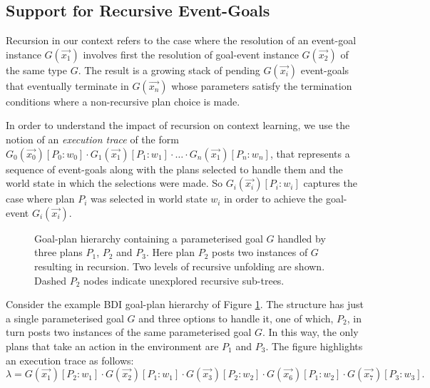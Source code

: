 \subsection{Support for Recursive Event-Goals}

Recursion in our context refers to the case where the resolution of an event-goal instance $G(\vec{x_1})$ involves first the resolution of goal-event instance $G(\vec{x_2})$ of the same type $G$. The result is a growing stack of pending $G(\vec{x_i})$ event-goals that eventually terminate in $G(\vec{x_n})$ whose parameters satisfy the termination conditions where a non-recursive plan choice is made.

In order to understand the impact of recursion on context learning, we use the notion of an \textit{execution trace} of the form $G_0(\vec{x_0})[P_0:w_0] \cdot G_1(\vec{x_1})[P_1:w_1] \cdot \ldots \cdot G_n(\vec{x_1})[P_n:w_n]$, that represents a sequence of event-goals along with the plans selected to handle them and the world state in which the selections were made. So $G_i(\vec{x_i})[P_i:w_i]$ captures the case where plan $P_i$ was selected in world state $w_i$ in order to achieve the goal-event $G_i(\vec{x_i})$.

\begin{figure}[t]
\begin{center}
\resizebox{0.8\textwidth}{!}{

}
\end{center}
\caption{Goal-plan hierarchy containing a parameterised goal $G$ handled by three plans $P_1$, $P_2$ and $P_3$. Here plan $P_2$ posts two instances of $G$ resulting in recursion. Two levels of recursive unfolding are shown. Dashed $P_2$ nodes indicate unexplored recursive sub-trees.}
\label{fig:unfolding}
\end{figure}

Consider the example BDI goal-plan hierarchy of Figure \ref{fig:unfolding}. The structure has just a single parameterised goal $G$ and three options to handle it, one of which, $P_2$, in turn posts two instances of the same parameterised goal $G$. In this way, the only plans that take an action in the environment are $P_1$ and $P_3$. The figure highlights an execution trace as follows: \[
\lambda=G(\vec{x_1})[P_2:w_1] \cdot G(\vec{x_2})[P_1:w_1] \cdot G(\vec{x_3})[P_2:w_2] \cdot G(\vec{x_6})[P_1:w_2] \cdot G(\vec{x_7})[P_3:w_3].
\]

